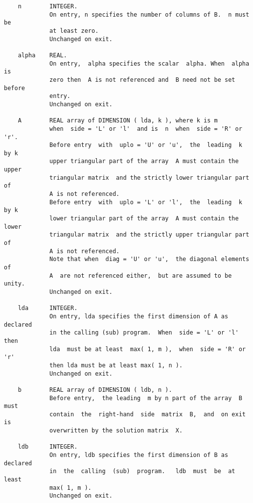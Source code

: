 \documentclass[10pt]{book}
\begin{document}
\begin{verbatim}
    n        INTEGER.
             On entry, n specifies the number of columns of B.  n must be
             at least zero.
             Unchanged on exit.
   
    alpha    REAL.
             On entry,  alpha specifies the scalar  alpha. When  alpha is
             zero then  A is not referenced and  B need not be set before
             entry.
             Unchanged on exit.
   
    A        REAL array of DIMENSION ( lda, k ), where k is m
             when  side = 'L' or 'l'  and is  n  when  side = 'R' or 'r'.
             Before entry  with  uplo = 'U' or 'u',  the  leading  k by k
             upper triangular part of the array  A must contain the upper
             triangular matrix  and the strictly lower triangular part of
             A is not referenced.
             Before entry  with  uplo = 'L' or 'l',  the  leading  k by k
             lower triangular part of the array  A must contain the lower
             triangular matrix  and the strictly upper triangular part of
             A is not referenced.
             Note that when  diag = 'U' or 'u',  the diagonal elements of
             A  are not referenced either,  but are assumed to be  unity.
             Unchanged on exit.
   
    lda      INTEGER.
             On entry, lda specifies the first dimension of A as declared
             in the calling (sub) program.  When  side = 'L' or 'l'  then
             lda  must be at least  max( 1, m ),  when  side = 'R' or 'r'
             then lda must be at least max( 1, n ).
             Unchanged on exit.
   
    b        REAL array of DIMENSION ( ldb, n ).
             Before entry,  the leading  m by n part of the array  B must
             contain  the  right-hand  side  matrix  B,  and  on exit  is
             overwritten by the solution matrix  X.
	   
    ldb      INTEGER.
             On entry, ldb specifies the first dimension of B as declared
             in  the  calling  (sub)  program.   ldb  must  be  at  least
             max( 1, m ).
             Unchanged on exit. 
\end{verbatim}

\newpage
\end{document}
